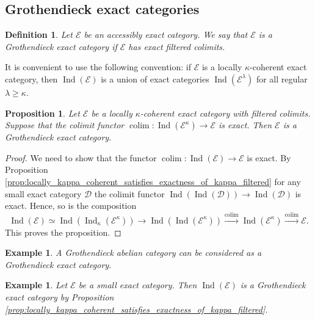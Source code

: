 \documentclass[11pt,leqno]{amsart}
\newtheorem{defi}[theo]{Definition}
\newtheorem{prop}[theo]{Proposition}
\newtheorem{example}[theo]{Example}
\numberwithin{equation}{section}
\DeclareMathOperator*{\colim}{colim}
\newcommand{\xto}{\xrightarrow}
\newcommand{\cD}{{\mathcal D}}
\newcommand{\cE}{{\mathcal E}}
\newcommand{\Ind}{\operatorname{Ind}}
\begin{document}

\subsection{Grothendieck exact categories}

\begin{defi}\label{def:Grothendieck_exact}
Let $\cE$ be an accessibly exact category. We say that $\cE$ is a Grothendieck exact category if
$\cE$ has exact filtered colimits. %
\end{defi}

It is convenient to use the following convention: if $\cE$ is a locally $\kappa$-coherent exact category, then $\Ind(\cE)$ is a union of exact categories $\Ind(\cE^{\lambda})$ for all regular $\lambda\geq \kappa.$

\begin{prop}\label{prop:Grothendieck_exact_reformulation}
Let $\cE$ be a locally $\kappa$-coherent exact category with filtered colimits. Suppose that the colimit functor $\colim:\Ind(\cE^{\kappa})\to\cE$ is exact. Then $\cE$ is a Grothendieck exact category. 
\end{prop}

\begin{proof}
We need to show that the functor $\colim:\Ind(\cE)\to \cE$ is exact. By Proposition \ref{prop:locally_kappa_coherent_satisfies_exactness_of_kappa_filtered} for any small exact category $\cD$ the colimit functor $\Ind(\Ind(\cD))\to\Ind(\cD)$ is exact. Hence, so is the composition
\begin{equation*}
\Ind(\cE)\simeq \Ind(\Ind_{\kappa}(\cE^{\kappa}))\to \Ind(\Ind(\cE^{\kappa}))\xto{\colim}\Ind(\cE^{\kappa})\xto{\colim}\cE.
\end{equation*}
This proves the proposition.
\end{proof}

\begin{example}
A Grothendieck abelian category can be considered as a Grothendieck exact category.
\end{example}

\begin{example}\label{ex:locally_coherent_exact}
Let $\cE$ be a small exact category. Then $\Ind(\cE)$ is a Grothendieck exact category by Proposition \ref{prop:locally_kappa_coherent_satisfies_exactness_of_kappa_filtered}.
\end{example}
\end{document}
